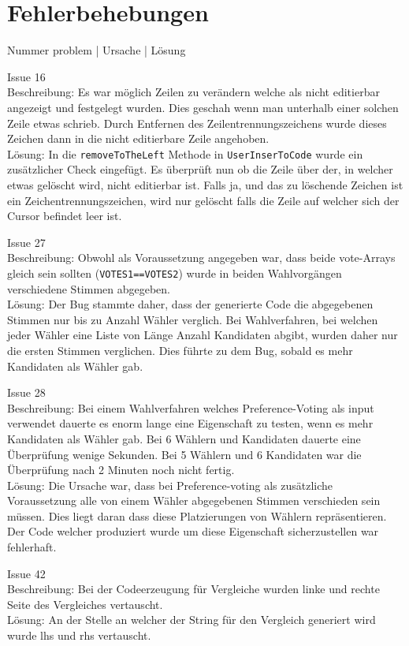 \documentclass[a4paper]{scrreprt}
\begin{document}
\chapter{Fehlerbehebungen}

Nummer problem | Ursache | Lösung

Issue 16\\
Beschreibung: Es war möglich Zeilen zu verändern welche als nicht editierbar angezeigt und festgelegt wurden. Dies geschah wenn man unterhalb einer solchen Zeile etwas schrieb. Durch Entfernen des Zeilentrennungszeichens wurde dieses Zeichen dann in die nicht editierbare Zeile angehoben.\\
Lösung: In die \verb!removeToTheLeft! Methode in \verb!UserInserToCode! wurde ein zusätzlicher Check eingefügt. Es überprüft nun ob die Zeile über der, in welcher etwas gelöscht wird, nicht editierbar ist. Falls ja, und das zu löschende Zeichen ist ein Zeichentrennungszeichen, wird nur gelöscht falls die Zeile auf welcher sich der Cursor befindet leer ist.

Issue 27\\
Beschreibung: Obwohl als Voraussetzung angegeben war, dass beide vote-Arrays gleich sein sollten (\verb!VOTES1==VOTES2!) wurde in beiden Wahlvorgängen verschiedene Stimmen abgegeben.\\
Lösung: Der Bug stammte daher, dass der generierte Code die abgegebenen Stimmen nur bis zu Anzahl Wähler verglich. Bei Wahlverfahren, bei welchen jeder Wähler eine Liste von Länge Anzahl Kandidaten abgibt, wurden daher nur die ersten Stimmen verglichen. Dies führte zu dem Bug, sobald es mehr Kandidaten als Wähler gab.

Issue 28\\
Beschreibung: Bei einem Wahlverfahren welches Preference-Voting als input verwendet dauerte es enorm lange eine Eigenschaft zu testen, wenn es mehr Kandidaten als Wähler gab. Bei 6 Wählern und Kandidaten dauerte eine Überprüfung wenige Sekunden. Bei 5 Wählern und 6 Kandidaten war die Überprüfung nach 2 Minuten noch nicht fertig.\\
Lösung: Die Ursache war, dass bei Preference-voting als zusätzliche Voraussetzung alle von einem Wähler abgegebenen Stimmen verschieden sein müssen. Dies liegt daran dass diese Platzierungen von Wählern repräsentieren. Der Code welcher produziert wurde um diese Eigenschaft sicherzustellen war fehlerhaft.

Issue 42\\
Beschreibung: Bei der Codeerzeugung für Vergleiche wurden linke und rechte Seite des Vergleiches vertauscht.\\
Lösung: An der Stelle an welcher der String für den Vergleich generiert wird wurde lhs und rhs vertauscht. 
 
\end{document}
